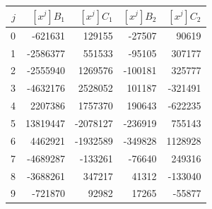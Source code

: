 \begin{center}
\small
\begin{tabular}{r|rr|rr}
$j$&$[x^j]B_1$&$[x^j]C_1$&$[x^j]B_2$&$[x^j]C_2$\\\hline
0&-621631&129155&-27507&90619\\
1&-2586377&551533&-95105&307177\\
2&-2555940&1269576&-100181&325777\\
3&-4632176&2528052&101187&-321491\\
4&2207386&1757370&190643&-622235\\
5&13819447&-2078127&-236919&755143\\
6&4462921&-1932589&-349828&1128928\\
7&-4689287&-133261&-76640&249316\\
8&-3688261&347217&41312&-133040\\
9&-721870&92982&17265&-55877\\
\end{tabular}
\end{center}
